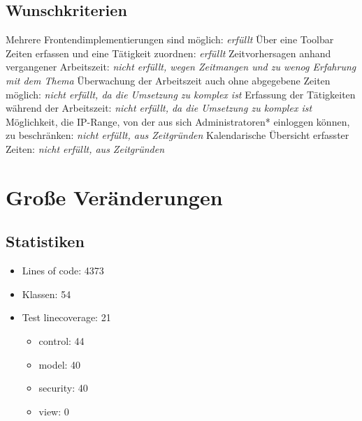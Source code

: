 \begin{frame}
	\subsection{Wunschkriterien}
	\begin{tabular}[l]
		Mehrere Frontendimplementierungen sind möglich: \emph{erfüllt}
		Über eine Toolbar Zeiten erfassen und eine Tätigkeit zuordnen: \emph{erfüllt}
		 Zeitvorhersagen anhand vergangener Arbeitszeit: \emph{nicht erfüllt, wegen Zeitmangen und zu wenog Erfahrung mit dem Thema}
		 Überwachung der Arbeitszeit auch ohne abgegebene Zeiten möglich: \emph{nicht erfüllt, da die Umsetzung zu komplex ist} 
		 Erfassung der Tätigkeiten während der Arbeitszeit: \emph{nicht erfüllt, da die Umsetzung zu komplex ist}
		 Möglichkeit, die IP-Range, von der aus sich Administratoren* einloggen können, zu beschränken: \emph{nicht erfüllt, aus Zeitgründen}
		 Kalendarische Übersicht erfasster Zeiten: \emph{nicht erfüllt, aus Zeitgründen}
	\end{tabular}
\end{frame}

\section{Große Veränderungen}


\begin{frame}
	\section{Statistiken}
	\begin{itemize}
		\item Lines of code: 4373
		\item Klassen: 54
		\item Test linecoverage: 21%
		\begin{itemize}
			\item control: 44%
			\item model: 40%
			\item security: 40%
			\item view: 0%
		\end{itemize}
	\end{itemize}
\end{frame}



